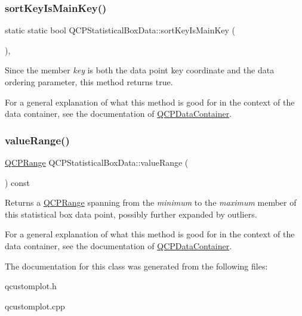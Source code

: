 \subsubsection{\texorpdfstring{sort\+Key\+Is\+Main\+Key()}{sortKeyIsMainKey()}}
{\footnotesize\ttfamily static static bool Q\+C\+P\+Statistical\+Box\+Data\+::sort\+Key\+Is\+Main\+Key (\begin{DoxyParamCaption}{ }\end{DoxyParamCaption})\hspace{0.3cm}{\ttfamily [inline]}, {\ttfamily [static]}}

Since the member {\itshape key} is both the data point key coordinate and the data ordering parameter, this method returns true.

For a general explanation of what this method is good for in the context of the data container, see the documentation of \hyperlink{classQCPDataContainer}{Q\+C\+P\+Data\+Container}. \mbox{\label{classQCPStatisticalBoxData_a1a2410fcf3d45fa3a1ad09e265b9bcad}} 
\subsubsection{\texorpdfstring{value\+Range()}{valueRange()}}
{\footnotesize\ttfamily \hyperlink{classQCPRange}{Q\+C\+P\+Range} Q\+C\+P\+Statistical\+Box\+Data\+::value\+Range (\begin{DoxyParamCaption}{ }\end{DoxyParamCaption}) const\hspace{0.3cm}{\ttfamily [inline]}}

Returns a \hyperlink{classQCPRange}{Q\+C\+P\+Range} spanning from the {\itshape minimum} to the {\itshape maximum} member of this statistical box data point, possibly further expanded by outliers.

For a general explanation of what this method is good for in the context of the data container, see the documentation of \hyperlink{classQCPDataContainer}{Q\+C\+P\+Data\+Container}. 

The documentation for this class was generated from the following files\+:\begin{DoxyCompactItemize}
\item 
qcustomplot.\+h\item 
qcustomplot.\+cpp\end{DoxyCompactItemize}
